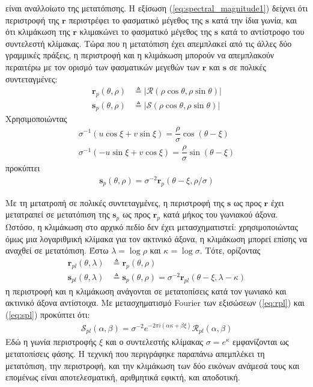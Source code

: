 είναι αναλλοίωτο της μετατόπισης. Η εξίσωση (\ref{eq:spectral_magnitude1})
δείχνει ότι περιστροφή της $\bm{r}$ περιστρέφει το φασματικό μέγεθος της
$\bm{s}$ κατά την ίδια γωνία, και ότι κλιμάκωση της $\bm{r}$ κλιμακώνει το
φασματικό μέγεθος της $\bm{s}$ κατά το αντίστροφο του συντελεστή κλίμακας. Τώρα
που η μετατόπιση έχει απεμπλακεί από τις άλλες δύο γραμμικές πράξεις, η
περιστροφή και η κλιμάκωση μπορούν να απεμπλακούν περαιτέρω με τον ορισμό των
φασματικών μεγεθών των $\bm{r}$ και $\bm{s}$ σε πολικές συντεταγμένες:
\begin{align}
  \bm{r}_p(\theta,\rho) &\triangleq |\mathcal{R} (\rho\cos\theta, \rho\sin\theta)| \nonumber \\
  \bm{s}_p(\theta,\rho) &\triangleq |\mathcal{S} (\rho\cos\theta, \rho\sin\theta)| \nonumber
\end{align}
Χρησιμοποιώντας
\begin{align}
  \sigma^{-1} (u\cos\xi+ v\sin\xi) = \dfrac{\rho}{\sigma} \cos(\theta - \xi) \nonumber \\
  \sigma^{-1} (-u\sin\xi+ v\cos\xi) = \dfrac{\rho}{\sigma} \sin(\theta - \xi) \nonumber
\end{align}
προκύπτει
\begin{align}
  \bm{s}_p(\theta,\rho) = \sigma^{-2} \bm{r}_p (\theta-\xi, \rho/\sigma) \nonumber
\end{align}

Με τη μετατροπή σε πολικές συντεταγμένες, η περιστροφή της $\bm{s}$ ως προς
$\bm{r}$ έχει μετατραπεί σε μετατόπιση της $\bm{s}_p$ ως προς
$\bm{r}_p$ κατά μήκος του γωνιακού άξονα. Ωστόσο, η κλιμάκωση στο αρχικό πεδίο
δεν έχει μετασχηματιστεί: χρησιμοποιώντας όμως μια λογαριθμική κλίμακα για τον
ακτινικό άξονα, η κλιμάκωση μπορεί επίσης να αναχθεί σε μετατόπιση. Έστω
$\lambda = \log\rho$ και $\kappa = \log\sigma$. Τότε, ορίζοντας
\begin{align}
  \bm{r}_{pl}(\theta, \lambda) &\triangleq \bm{r}_p(\theta,\rho) \label{eq:rpl} \\
  \bm{s}_{pl}(\theta, \lambda) &\triangleq \bm{s}_p(\theta,\rho) = \sigma^{-2} \bm{r}_{pl} (\theta-\xi, \lambda - \kappa) \label{eq:spl}
\end{align}
η περιστροφή και η κλιμάκωση ανάγονται σε μετατοπίσεις κατά τον γωνιακό και
ακτινικό άξονα αντίστοιχα. Με μετασχηματισμό Fourier των εξισώσεων (\ref{eq:rpl})
και (\ref{eq:spl}) προκύπτει ότι:
\begin{align}
  \mathcal{S}_{pl}(\alpha,\beta) = \sigma^{-2} e^{-2 \pi i(\alpha\kappa + \beta\xi)} \mathcal{R}_{pl}(\alpha,\beta) \nonumber
\end{align}
Εδώ η γωνία περιστροφής $\xi$ και ο συντελεστής κλίμακας $\sigma = e^{\kappa}$
εμφανίζονται ως μετατοπίσεις φάσης. Η τεχνική που περιγράφηκε παραπάνω
απεμπλέκει τη μετατόπιση, την περιστροφή, και την κλιμάκωση των δύο εικόνων
ανάμεσά τους και επομένως είναι αποτελεσματική, αριθμητικά εφικτή, και
αποδοτική.

